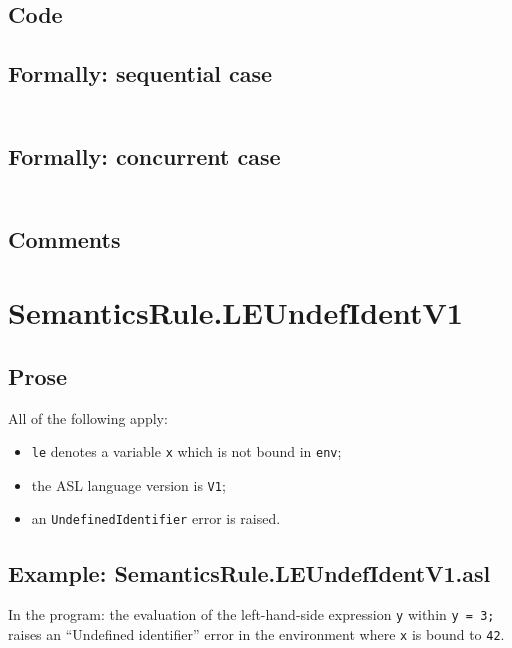 \documentclass{book}
\begin{document}
  \subsection{Code}

  \subsection{Formally: sequential case}
  \begin{align}
  \end{align} 

  \subsection{Formally: concurrent case}
  \begin{align}
  \end{align} 

  \subsection{Comments}

\section{SemanticsRule.LEUndefIdentV1 \label{sec:SemanticsRule.LEUndefIdentV1}}

    \subsection{Prose}
    All of the following apply:
    \begin{itemize}
    \item \texttt{le} denotes a variable \texttt{x} which is not bound in \texttt{env};
    \item the ASL language version is \texttt{V1};
    \item an \texttt{UndefinedIdentifier} error is raised.
    \end{itemize}

    \subsection{Example: SemanticsRule.LEUndefIdentV1.asl}
    In the program:
    the evaluation of the left-hand-side expression \texttt{y} within \texttt{y
= 3;} raises an ``Undefined identifier'' error in the environment where
\texttt{x} is bound to \texttt{42}.
\end{document}
